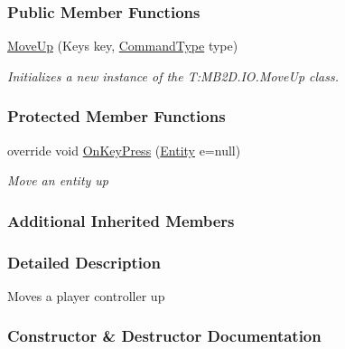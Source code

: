 \subsubsection*{Public Member Functions}
\begin{DoxyCompactItemize}
\item 
\hyperlink{class_m_b2_d_1_1_i_o_1_1_move_up_aa89faa4b42d3073b1fe6ddbd3da1e4f9}{Move\+Up} (Keys key, \hyperlink{namespace_m_b2_d_1_1_i_o_ab5f95f3fe9e652778b62bdf943168a68}{Command\+Type} type)
\begin{DoxyCompactList}\small\item\em Initializes a new instance of the T\+:\+M\+B2\+D.\+I\+O.\+Move\+Up class. \end{DoxyCompactList}\end{DoxyCompactItemize}
\subsubsection*{Protected Member Functions}
\begin{DoxyCompactItemize}
\item 
override void \hyperlink{class_m_b2_d_1_1_i_o_1_1_move_up_acb3f90aeea44eeffefbb664e898b0a91}{On\+Key\+Press} (\hyperlink{class_m_b2_d_1_1_entity_component_1_1_entity}{Entity} e=null)
\begin{DoxyCompactList}\small\item\em Move an entity up \end{DoxyCompactList}\end{DoxyCompactItemize}
\subsubsection*{Additional Inherited Members}


\subsubsection{Detailed Description}
Moves a player controller up 



\subsubsection{Constructor \& Destructor Documentation}
\hypertarget{class_m_b2_d_1_1_i_o_1_1_move_up_aa89faa4b42d3073b1fe6ddbd3da1e4f9}{}\label{class_m_b2_d_1_1_i_o_1_1_move_up_aa89faa4b42d3073b1fe6ddbd3da1e4f9} 

